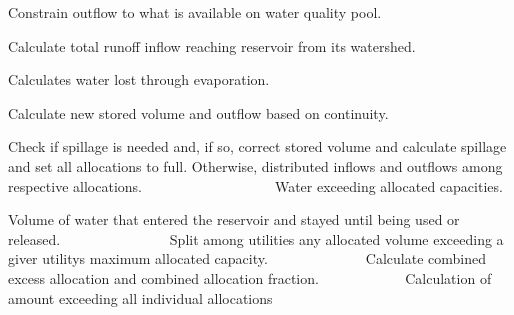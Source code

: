 Constrain outflow to what is available on water quality pool.

Calculate total runoff inflow reaching reservoir from its watershed.

Calculates water lost through evaporation.

Calculate new stored volume and outflow based on continuity.

Check if spillage is needed and, if so, correct stored volume and calculate spillage and set all allocations to full. Otherwise, distributed inflows and outflows among respective allocations. ~\newline
~\newline
~\newline
~\newline
~\newline
~\newline
~\newline
~\newline
~\newline
~\newline
~\newline
 Water exceeding allocated capacities.

Volume of water that entered the reservoir and stayed until being used or released. ~\newline
~\newline
~\newline
~\newline
~\newline
~\newline
~\newline
~\newline
~\newline
 Split among utilities any allocated volume exceeding a giver utility\textquotesingle{}s maximum allocated capacity. ~\newline
~\newline
~\newline
~\newline
~\newline
~\newline
~\newline
~\newline
 Calculate combined excess allocation and combined allocation fraction. ~\newline
~\newline
~\newline
~\newline
~\newline
~\newline
~\newline
 Calculation of amount exceeding all individual allocations


